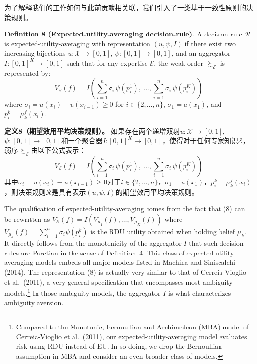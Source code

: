 \documentclass[12pt,a4paper]{article}
\newenvironment{original}
  {\par\noindent\ignorespaces}
  {\par}
\newenvironment{translation}
  {\par\noindent{\color{transblue}\ignorespaces}}
  {\par\medskip}
\begin{document}
\begin{translation}
为了解释我们的工作如何与此前贡献相关联，我们引入了一类基于一致性原则的决策规则。
\end{translation}

\begin{original}
\textbf{Definition 8 (Expected-utility-averaging decision-rule).} A decision-rule $\mathcal{R}$ is expected-utility-averaging with representation $(u, \psi, I)$ if there exist two increasing bijections $u: \mathcal{X} \to [0,1]$, $\psi: [0,1] \to [0,1]$, and an aggregator $I: [0,1]^{K} \to [0,1]$ such that for any expertise $\mathcal{E}$, the weak order $\succsim_{\mathcal{E}}$ is represented by:
\[
V_{\mathcal{E}}(f) = I\!\left( \sum_{i=1}^{n} \sigma_{i} \, \psi(p^{1}_{i}), \;\dots, \sum_{i=1}^{n} \sigma_{i} \, \psi(p^{K}_{i}) \right) \tag{8}
\]
where $\sigma_{i} = u(x_{i}) - u(x_{i-1}) \geq 0$ for $i \in \{2, \dots, n\}$, $\sigma_{1} = u(x_{1})$, and $p^{k}_{i} = \mu_{k}^{f}(x_{i})$.
\end{original}

\begin{translation}
\textbf{定义8（期望效用平均决策规则）。} 如果存在两个递增双射$u: \mathcal{X} \to [0,1]$, $\psi: [0,1] \to [0,1]$和一个聚合器$I: [0,1]^{K} \to [0,1]$，使得对于任何专家知识$\mathcal{E}$，弱序$\succsim_{\mathcal{E}}$由以下公式表示：
\[
V_{\mathcal{E}}(f) = I\!\left( \sum_{i=1}^{n} \sigma_{i} \, \psi(p^{1}_{i}), \;\dots, \sum_{i=1}^{n} \sigma_{i} \, \psi(p^{K}_{i}) \right) \tag{8}
\]
其中$\sigma_{i} = u(x_{i}) - u(x_{i-1}) \geq 0$对于$i \in \{2, \dots, n\}$，$\sigma_{1} = u(x_{1})$，$p^{k}_{i} = \mu_{k}^{f}(x_{i})$，则决策规则$\mathcal{R}$是具有表示$(u, \psi, I)$的期望效用平均决策规则。
\end{translation}

\begin{original}
The qualification of expected-utility-averaging comes from the fact that (8) can be rewritten as $V_{\mathcal{E}}(f) = I(V_{\mu_{1}}(f), \dots, V_{\mu_{K}}(f))$ where $V_{\mu_{k}}(f) = \sum_{i=1}^{n} \sigma_{i} \psi(p^{k}_{i})$ is the RDU utility obtained when holding belief $\mu_{k}$. It directly follows from the monotonicity of the aggregator $I$ that such decision-rules are Paretian in the sense of Definition~4. This class of expected-utility-averaging models embeds all major models listed in Machina and Siniscalchi (2014). The representation (8) is actually very similar to that of Cerreia-Vioglio et al.\ (2011), a very general specification that encompasses most ambiguity models.\footnote{Compared to the Monotonic, Bernoullian and Archimedean (MBA) model of Cerreia-Vioglio et al.\ (2011), our expected-utility-averaging model evaluates risk using RDU instead of EU. In so doing, we drop the Bernoullian assumption in MBA and consider an even broader class of models.} In those ambiguity models, the aggregator $I$ is what characterizes ambiguity aversion.
\end{original}
\end{document}
